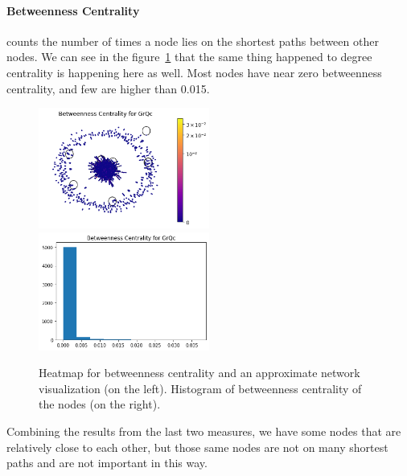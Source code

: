 \documentclass[letterpaper, 11pt]{article}
\newcommand{\1}{\mathds{1}}	%
\theoremstyle{definition}
\begin{document}
\paragraph{Betweenness Centrality}counts the number of times a node lies on the shortest paths between other nodes. We can see in the figure~\ref{fig:b_cent} that the same thing happened to degree centrality is happening here as well. Most nodes have near zero betweenness centrality, and few are higher than 0.015. 
\begin{figure}[h]
\includegraphics[width=0.5\textwidth]{GrQc_b_cent.png}
\includegraphics[width=0.5\textwidth]{GrQc_b_cent_hist.png}
\captionsetup{justification=centering,margin=0.5cm}
\caption{Heatmap for betweenness centrality and an approximate network visualization (on the left). Histogram of betweenness centrality of the nodes (on the right).}
\label{fig:b_cent}
\end{figure}
Combining the results from the last two measures, we have some nodes that are relatively close to each other, but those same nodes are not on many shortest paths and are not important in this way.
\end{document}

